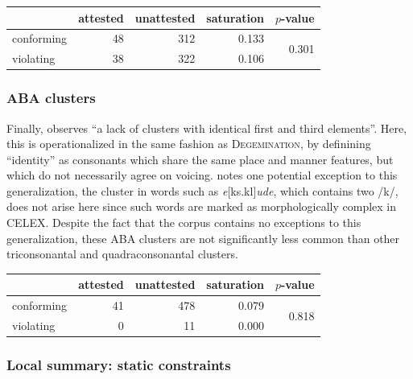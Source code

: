 \begin{example}
\begin{tabular}{l r r r r}
\toprule
           & attested & unattested & saturation & $p$-value              \\
\midrule
conforming & 48       & 312        & 0.133      & \multirow{2}{*}{0.301} \\
violating  & 38       & 322        & 0.106                               \\
\bottomrule
\end{tabular}
\end{example}

\subsubsection{ABA clusters}

Finally, \citet[][176]{Pierrehumbert1994} observes ``a lack of clusters with identical first and third elements''. Here, this is operationalized in the same fashion as \textsc{Degemination}, by definining ``identity'' as consonants which share the same place and manner features, but which do not necessarily agree on voicing. \citeauthor{Pierrehumbert1994} notes one potential exception to this generalization, the cluster in words such as \emph{e}[ks.kl]\emph{ude}, which contains two /k/, does not arise here since such words are marked as morphologically complex in CELEX. Despite the fact that the corpus contains no exceptions to this generalization, these \textsc{ABA} clusters are not significantly less common than other triconsonantal and quadraconsonantal clusters. 

\begin{example}
\begin{tabular}{l r r r r}
\toprule
           & attested & unattested & saturation & $p$-value \\
\midrule
conforming & 41       & 478        & 0.079      & \multirow{2}{*}{0.818} \\
violating  &  0       &  11        & 0.000                               \\
\bottomrule
\end{tabular}
\end{example}

\subsubsection{Local summary: static constraints}

